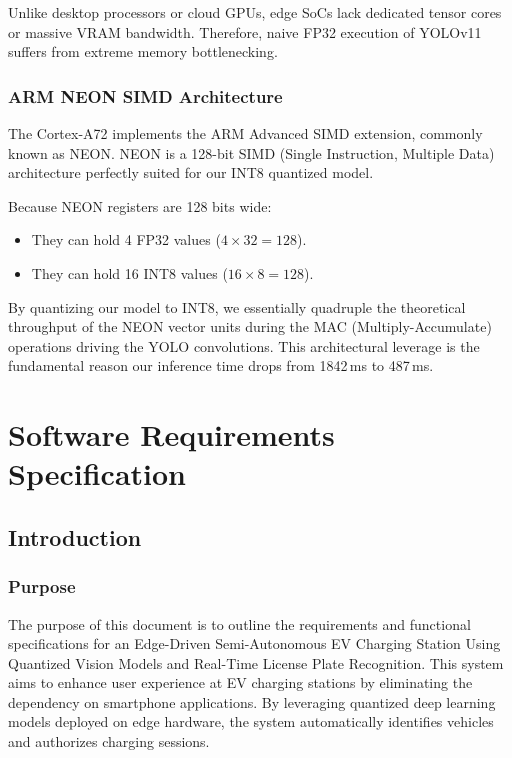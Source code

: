 Unlike desktop processors or cloud GPUs, edge SoCs lack dedicated tensor cores or massive VRAM bandwidth. Therefore, naive FP32 execution of YOLOv11 suffers from extreme memory bottlenecking.

\subsection{ARM NEON SIMD Architecture}
The Cortex-A72 implements the ARM Advanced SIMD extension, commonly known as NEON. NEON is a 128-bit SIMD (Single Instruction, Multiple Data) architecture perfectly suited for our INT8 quantized model.

Because NEON registers are 128 bits wide:
\begin{itemize}
    \item They can hold 4 FP32 values ($4 \times 32 = 128$).
    \item They can hold 16 INT8 values ($16 \times 8 = 128$).
\end{itemize}

By quantizing our model to INT8, we essentially quadruple the theoretical throughput of the NEON vector units during the MAC (Multiply-Accumulate) operations driving the YOLO convolutions. This architectural leverage is the fundamental reason our inference time drops from 1842\,ms to 487\,ms.



\chapter{Software Requirements Specification}
\section{Introduction}
\subsection{Purpose}
The purpose of this document is to outline the requirements and functional specifications for an Edge-Driven Semi-Autonomous EV Charging Station Using Quantized Vision Models and Real-Time License Plate Recognition. This system aims to enhance user experience at EV charging stations by eliminating the dependency on smartphone applications. By leveraging quantized deep learning models deployed on edge hardware, the system automatically identifies vehicles and authorizes charging sessions.

